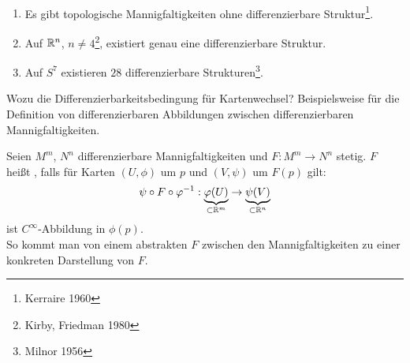 \begin{remark}
  \
  \begin{enumerate}
    \item Es gibt topologische Mannigfaltigkeiten ohne differenzierbare Struktur\footnote{Kerraire 1960}.
    \item Auf $ \mathbb{R}^n $, $ n \neq 4 $\footnote{Kirby, Friedman 1980}, existiert genau eine differenzierbare Struktur.
    \item Auf $ S^7 $ existieren $ 28 $ differenzierbare Strukturen\footnote{Milnor 1956}.
  \end{enumerate}
\end{remark}

Wozu die Differenzierbarkeitsbedingung für Kartenwechsel? Beispielsweise für die Definition von differenzierbaren Abbildungen zwischen differenzierbaren Mannigfaltigkeiten.

\begin{definition}[Differenzierbarkeit]
  Seien $ M^m $, $ N^n $ differenzierbare Mannigfaltigkeiten und $ F: M^m \to N^n $ stetig. $ F $ heißt \label{def:differenzierbar}, falls für Karten $ (U, \phi) $ um $ p $ und $ (V, \psi) $ um $ F(p) $ gilt:
  \begin{equation*}
    \psi \circ F \circ \varphi^{-1}: \underbrace{\varphi(U)}_{\subset \mathbb{R}^m} \to \underbrace{\psi(V)}_{\subset \mathbb{R}^n}
  \end{equation*}
  ist $ C^\infty $-Abbildung in $ \phi(p) $. \\
  So kommt man von einem abstrakten $ F $ zwischen den Mannigfaltigkeiten zu einer konkreten Darstellung von $ F $.
\end{definition}
